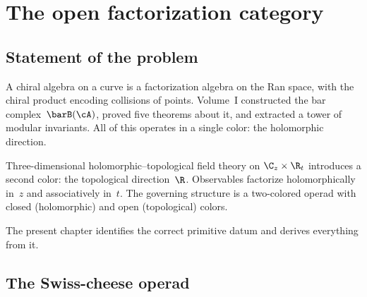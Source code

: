 %

\section{The open factorization category}
\label{sec:open-primitive}

\subsection{Statement of the problem}

A chiral algebra on a curve is a factorization algebra on the
Ran space, with the chiral product encoding collisions of
points. Volume~I constructed the bar complex~$\barB(\cA)$,
proved five theorems about it, and extracted a tower of modular
invariants. All of this operates in a single color: the
holomorphic direction.

Three-dimensional holomorphic--topological field theory on
$\C_z \times \R_t$ introduces a second color: the topological
direction~$\R$. Observables factorize holomorphically in~$z$ and
associatively in~$t$. The governing structure is a two-colored
operad with closed (holomorphic) and open (topological) colors.

The present chapter identifies the correct primitive datum and
derives everything from it.

\subsection{The Swiss-cheese operad}\label{subsec:sc-operad}

